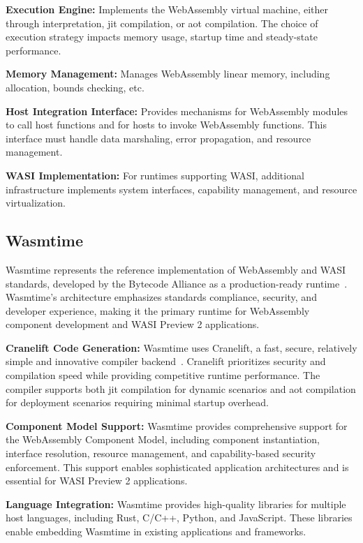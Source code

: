 \textbf{Execution Engine:} Implements the WebAssembly virtual machine, either through interpretation, \acrfull{jit} compilation, or \acrfull{aot} compilation. The choice of execution strategy impacts memory usage, startup time and steady-state performance.

\textbf{Memory Management:} Manages WebAssembly linear memory, including allocation, bounds checking, etc.

\textbf{Host Integration Interface:} Provides mechanisms for WebAssembly modules to call host functions and for hosts to invoke WebAssembly functions. This interface must handle data marshaling, error propagation, and resource management.

\textbf{WASI Implementation:} For runtimes supporting WASI, additional infrastructure implements system interfaces, capability management, and resource virtualization.

\subsection{Wasmtime}
\label{subsec:wasmtime}

Wasmtime represents the reference implementation of WebAssembly and WASI standards, developed by the Bytecode Alliance as a production-ready runtime~\cite{wasmtime_project}. Wasmtime's architecture emphasizes standards compliance, security, and developer experience, making it the primary runtime for WebAssembly component development and WASI Preview 2 applications.

\textbf{Cranelift Code Generation:} Wasmtime uses Cranelift, a fast, secure, relatively simple and innovative compiler backend~\cite{cranelift}. Cranelift prioritizes security and compilation speed while providing competitive runtime performance. The compiler supports both \acrshort{jit} compilation for dynamic scenarios and \acrshort{aot} compilation for deployment scenarios requiring minimal startup overhead.

\textbf{Component Model Support:} Wasmtime provides comprehensive support for the WebAssembly Component Model, including component instantiation, interface resolution, resource management, and capability-based security enforcement. This support enables sophisticated application architectures and is essential for WASI Preview 2 applications.

\textbf{Language Integration:} Wasmtime provides high-quality libraries for multiple host languages, including Rust, C/C++, Python, and JavaScript. These libraries enable embedding Wasmtime in existing applications and frameworks.

